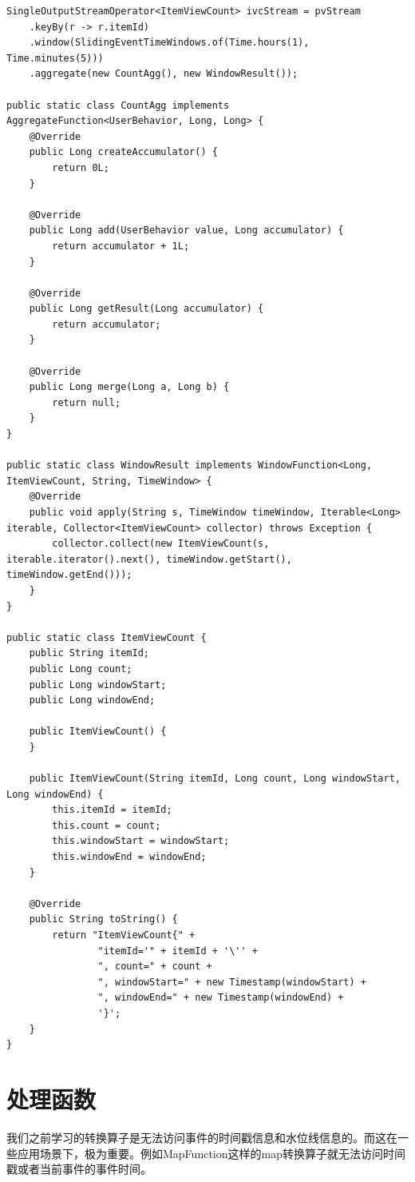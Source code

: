 \documentclass[cn,11pt,chinese]{elegantbook}
\begin{document}
\begin{verbatim}
SingleOutputStreamOperator<ItemViewCount> ivcStream = pvStream
    .keyBy(r -> r.itemId)
    .window(SlidingEventTimeWindows.of(Time.hours(1), Time.minutes(5)))
    .aggregate(new CountAgg(), new WindowResult());

public static class CountAgg implements AggregateFunction<UserBehavior, Long, Long> {
    @Override
    public Long createAccumulator() {
        return 0L;
    }

    @Override
    public Long add(UserBehavior value, Long accumulator) {
        return accumulator + 1L;
    }

    @Override
    public Long getResult(Long accumulator) {
        return accumulator;
    }

    @Override
    public Long merge(Long a, Long b) {
        return null;
    }
}

public static class WindowResult implements WindowFunction<Long, ItemViewCount, String, TimeWindow> {
    @Override
    public void apply(String s, TimeWindow timeWindow, Iterable<Long> iterable, Collector<ItemViewCount> collector) throws Exception {
        collector.collect(new ItemViewCount(s, iterable.iterator().next(), timeWindow.getStart(), timeWindow.getEnd()));
    }
}

public static class ItemViewCount {
    public String itemId;
    public Long count;
    public Long windowStart;
    public Long windowEnd;

    public ItemViewCount() {
    }

    public ItemViewCount(String itemId, Long count, Long windowStart, Long windowEnd) {
        this.itemId = itemId;
        this.count = count;
        this.windowStart = windowStart;
        this.windowEnd = windowEnd;
    }

    @Override
    public String toString() {
        return "ItemViewCount{" +
                "itemId='" + itemId + '\'' +
                ", count=" + count +
                ", windowStart=" + new Timestamp(windowStart) +
                ", windowEnd=" + new Timestamp(windowEnd) +
                '}';
    }
}
\end{verbatim}

\chapter{处理函数}

我们之前学习的转换算子是无法访问事件的时间戳信息和水位线信息的。而这在一些应用场景下，极为重要。例如MapFunction这样的map转换算子就无法访问时间戳或者当前事件的事件时间。
\end{document}
